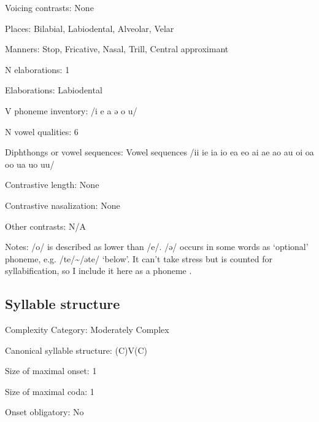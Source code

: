 {\begin{appendixdesc}
\item[Voicing contrasts:] None

\item[Places:] Bilabial, Labiodental, Alveolar, Velar

\item[Manners:] Stop, Fricative, Nasal, Trill, Central approximant

\item[N elaborations:] 1

\item[Elaborations:] Labiodental

\item[V phoneme inventory:] /i e a ə o u/

\item[N vowel qualities:] 6

\item[Diphthongs or vowel sequences:] Vowel sequences /ii ie ia io ea eo ai ae ao au oi oa oo ua uo uu/

\item[Contrastive length:] None

\item[Contrastive nasalization:] None

\item[Other contrasts:] N/A

\item[Notes:] /o/ is described as lower than /e/. /ə/ occurs in some words as ‘optional’ phoneme, e.g. /te/{\textasciitilde}/əte/ ‘below’. It can’t take stress but is counted for syllabification, so I include it here as a phoneme \citep[15--18]{Dol2007}.
\end{appendixdesc}
\subsection*{Syllable structure}
\begin{appendixdesc}

\item[Complexity Category:] Moderately Complex

\item[Canonical syllable structure:] (C)V(C) \citep[34--38]{Dol2007}

\item[Size of maximal onset:] 1

\item[Size of maximal coda:] 1

\item[Onset obligatory:] No


\end{appendixdesc}}
